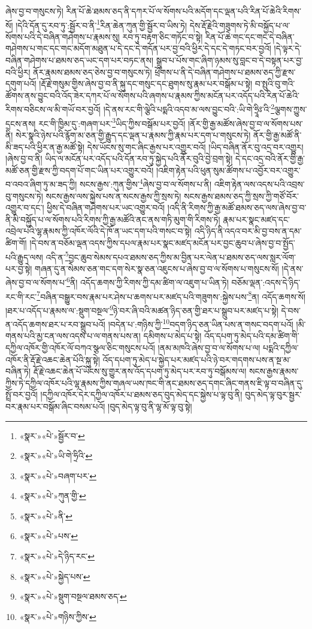 ཞེས་བྱ་བ་གསུངས་ཏེ། རིན་པོ་ཆེ་ཐམས་ཅད་ནི་དཀར་པོ་ལ་སོགས་པའི་མདོག་དང་ལྡན་པའི་རིན་པོ་ཆེའི་རིགས་སོ། །དེའི་དོན་དུ་རབ་ཏུ་:སྦྱོར་བ་ནི་\footnote{«སྣར་»«པེ་»སྦྱོར་བ་}རིན་ཆེན་ཀུན་གྱི་སྦྱོར་བ་ཡིས་ཏེ། དེས་རྡོ་རྗེའི་གཟུགས་ཏེ་མི་བསྐྱོད་པ་ལ་སོགས་པའི་དེ་བཞིན་གཤེགས་པ་རྣམས་སུ། རབ་ཏུ་བརྟག་ཅིང་གཏོང་བ་སྟེ། རིན་པོ་ཆེ་གང་དང་གང་དེ་བཞིན་གཤེགས་པ་གང་དང་གང་མདོག་མཐུན་པ་དེ་དང་དེ་གདོན་པར་བྱ་བའི་ཕྱིར་དེ་དང་དེ་གཏང་བར་བྱའོ། །དེ་ལྟར་དེ་བཞིན་གཤེགས་པ་ཐམས་ཅད་ཡང་དག་པར་བཏང་ནས། སྒྲུབ་པ་པོས་གང་ཞིག་ཉམས་སུ་བླང་བ་དེ་བསྟན་པར་བྱ་བའི་ཕྱིར། ནོར་རྣམས་ཐམས་ཅད་ཅེས་བྱ་བ་གསུངས་ཏེ། ཕྲོགས་པ་ནི་དེ་བཞིན་གཤེགས་པ་ཐམས་ཅད་ཀྱི་རྫས་དགུག་པའོ། །རྡོ་རྗེ་གསུམ་གྱིས་ཞེས་བྱ་བ་ནི་སྐུ་དང་གསུང་དང་ཐུགས་སུ་རྣམ་པར་བསྒོམ་པ་སྟེ། བ་སྤུའི་བུ་གའི་ཚོགས་ནས་བྱུང་བའི་འོད་ཟེར་དཀར་པོ་ལ་སོགས་པའི་ཞགས་པ་རྣམས་ཀྱིས་མངོན་པར་འདོད་པའི་རིན་པོ་ཆེའི་རིགས་བཅིངས་ལ་མི་གཡོ་བར་བྱའོ། །དེ་ནས་རང་གི་ལྕེའི་པདྨའི་འདབ་མ་ལས་བྱུང་བའི་:ཡི་གེ་ཧྲཱིཿ་འི་\footnote{«སྣར་»«པེ་»ཡི་གེ་ཧྲིའི་}ལྕགས་ཀྱུས་དྲངས་ནས། རང་གི་ཁྱིམ་དུ་:གཞག་པར་\footnote{«སྣར་»«པེ་»བཞག་པར་}ཡིད་ཀྱིས་བསྒོམ་པར་བྱའོ། །ནོར་གྱི་རྒྱ་མཚོས་ཞེས་བྱ་བ་ལ་སོགས་པས་ནི། སེར་སྣའི་ཉེས་པའི་རྙོག་མ་ཅན་གྱི་རྒྱུད་དང་ལྡན་པ་རྣམས་ཀྱི་རྣམ་པར་དག་པ་གསུངས་ཏེ། ནོར་གྱི་རྒྱ་མཚོ་ནི་མི་ཟད་པའི་ཕྱིར་ན་རྒྱ་མཚོ་སྟེ། དེས་ཡོངས་སུ་གང་ཞིང་རྒྱས་པར་འགྱུར་བའོ། །ཡིད་བཞིན་ནོར་བུ་འདྲ་བར་འགྱུར། །ཞེས་བྱ་བ་ནི། ཡིད་ལ་མངོན་པར་འདོད་པའི་དོན་རབ་ཏུ་སྐྱེད་པའི་ནོར་བུའི་བྱེ་བྲག་སྟེ། དེ་དང་འདྲ་བའི་ནོར་གྱི་རྒྱ་མཚོ་ཅན་གྱི་རྫས་ཀྱི་བདག་པོ་གང་ཡིན་པར་འགྱུར་བའོ། །འཇིག་རྟེན་པའི་ཕུན་སུམ་ཚོགས་པ་འབྱོར་བར་འགྱུར་བ་འབའ་ཞིག་ཏུ་མ་ཟད་ཀྱི། སངས་རྒྱས་:ཀུན་གྱིས་\footnote{«སྣར་»«པེ་»ཀུན་གྱི་}ཞེས་བྱ་བ་ལ་སོགས་པ་ནི། འཇིག་རྟེན་ལས་འདས་པའི་འབྲས་བུ་གསུངས་ཏེ། སངས་རྒྱས་ལས་སྐྱེས་པས་ན་སངས་རྒྱས་ཀྱི་སྲས་ཏེ། སངས་རྒྱས་ཐམས་ཅད་ཀྱི་སྲས་ཀྱི་གཙོ་བོར་འགྱུར་བ་དང་། ཕྱིས་དེ་བཞིན་གཤེགས་པར་ཡང་འགྱུར་བའོ། །འདི་ནི་རིགས་ཀྱི་རྒྱ་མཚོ་ཐམས་ཅད་ལས་ཞེས་བྱ་བ་ནི་མི་བསྐྱོད་པ་ལ་སོགས་པའི་རིགས་ཀྱི་རྒྱ་མཚོའི་ནང་ནས་གཏི་མུག་གི་རིགས་ཏེ། རྣམ་པར་སྣང་མཛད་དང་འབྲེལ་པའི་ལྷ་རྣམས་ཀྱི་འཁོར་ལོའི་དེ་ཁོ་ན་ཡང་དག་པའི་གསང་བ་སྟེ། འདི་ཉིད་ནི་འདའ་བར་མི་བྱ་བས་ན་དམ་ཚིག་གོ། །དེ་བས་ན་བཅོམ་ལྡན་འདས་ཀྱིས་དཔལ་རྣམ་པར་སྣང་མཛད་མངོན་པར་བྱང་ཆུབ་པ་ཞེས་བྱ་བ་སྤྱོད་པའི་རྒྱུད་ལས། འདི་ན་\footnote{«སྣར་»«པེ་»ནི་}བྱང་ཆུབ་སེམས་དཔའ་ཐམས་ཅད་ཀྱིས་མ་བྱིན་པར་ལེན་པ་ཐམས་ཅད་ལས་སླར་ལོག་པར་བྱ་སྟེ། གཞན་དུ་ན་སེམས་ཅན་གང་དག་སེར་སྣ་ཅན་འཇུངས་པ་ཞེས་བྱ་བ་ལ་སོགས་པ་གསུངས་སོ། །དེ་ནས་ཞེས་བྱ་བ་ལ་སོགས་པ་\footnote{«སྣར་»«པེ་»པས་}ནི། འདོད་ཆགས་ཀྱི་རིགས་ཀྱི་དམ་ཚིག་ལ་འཇུག་པ་ཡིན་ཏེ། བཅོམ་ལྡན་:འདས་དེ་ཉིད་རང་གི་རང་\footnote{«སྣར་»«པེ་»དེ་ཉིད་རང་}བཞིན་བསྒྱུར་བས་རྣམ་པར་ཤེས་པ་ཆགས་པར་མཛད་པའི་གཟུགས་:སྐྱེས་པས་\footnote{«སྣར་»«པེ་»སྐྱེད་པས་}ན། འདོད་ཆགས་སོ། །ཐར་པ་འདོད་པ་རྣམས་ལ་:སྡུག་བསྔལ་\footnote{«སྣར་»«པེ་»སྡུག་བསྔལ་ཐམས་ཅད་}ཉེ་བར་ཞི་བའི་མཚན་ཉིད་ཅན་གྱི་ཐར་པ་སྒྲུབ་པར་མཛད་པ་སྟེ། དེ་བས་ན་འདོད་ཆགས་ཐར་པ་རབ་སྒྲུབ་པའོ། །བདེན་པ་:གཉིས་ཀྱི་\footnote{«སྣར་»«པེ་»གཉིས་ཀྱིས་}བདག་ཉིད་ཅན་ཡིན་པས་ན་གསང་བདག་པའོ། །མི་གནས་པའི་མྱ་ངན་ལས་འདས་པ་ལ་གནས་པས་ན། དམིགས་པ་མེད་པ་སྟེ། འོད་དཔག་ཏུ་མེད་པའི་དམ་ཚིག་གི་དཀྱིལ་འཁོར་གྱི་འཁོར་ལོ་བཀའ་སྩལ་ཅིང་གསུངས་པའོ། །ནམ་མཁའི་ཞེས་བྱ་བ་ལ་སོགས་པ་ལ། པདྨའི་དཀྱིལ་འཁོར་ནི་རྡོ་རྗེ་འཆང་ཆེན་པོའི་སྐུ་སྟེ། འོད་དཔག་ཏུ་མེད་པ་སྐྱེད་པར་མཛད་པའི་ཉེ་བར་གདགས་པས་ན་སྔ་མ་བཞིན་ཏེ། རྡོ་རྗེ་འཆང་ཆེན་པོ་ཡོངས་སུ་གྱུར་ནས་འོད་དཔག་ཏུ་མེད་པར་རབ་ཏུ་བསྒོམས་ལ། སངས་རྒྱས་རྣམས་ཀྱིས་ཏེ་དཀྱིལ་འཁོར་པའི་ལྷ་རྣམས་ཀྱིས་གཞལ་ཡས་ཁང་གི་ནང་ཐམས་ཅད་དགང་ཞིང་གནས་ཇི་ལྟ་བ་བཞིན་དུ་སྤྲོ་བར་བྱའོ། །དཀྱིལ་འཁོར་དེར་དཀྱིལ་འཁོར་པ་ཐམས་ཅད་བུད་མེད་དང་སྐྱེས་པ་ལྟ་བུ་ནི། བུད་མེད་ལྟ་བུར་སྦྱར་བར་རྣམ་པར་བསྒོམ་ཞིང་བསམ་པའོ། །བུད་མེད་ལྟ་བུ་ནི་ལྷ་མོ་ལྟ་བུ་སྟེ། 